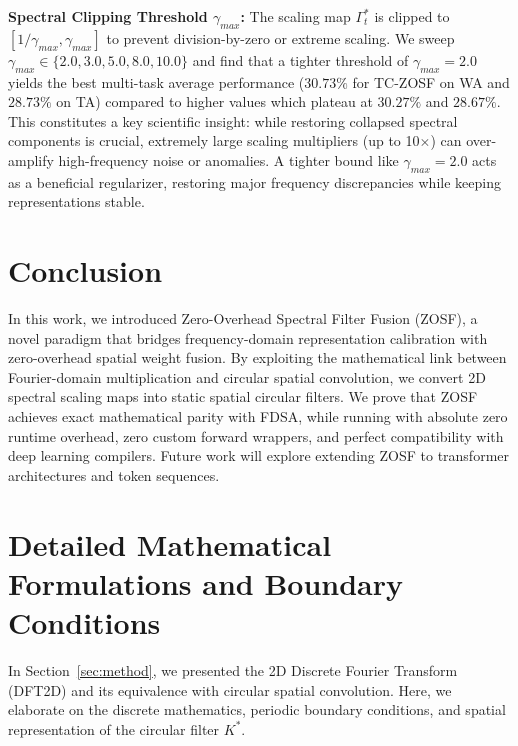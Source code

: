 \documentclass{article}
\theoremstyle{plain}
\theoremstyle{definition}
\theoremstyle{remark}
\begin{document}
\textbf{Spectral Clipping Threshold $\gamma_{max}$:} The scaling map $\Gamma^*_t$ is clipped to $[1/\gamma_{max}, \gamma_{max}]$ to prevent division-by-zero or extreme scaling. We sweep $\gamma_{max} \in \{2.0, 3.0, 5.0, 8.0, 10.0\}$ and find that a tighter threshold of $\gamma_{max} = 2.0$ yields the best multi-task average performance ($30.73\%$ for TC-ZOSF on WA and $28.73\%$ on TA) compared to higher values which plateau at $30.27\%$ and $28.67\%$. This constitutes a key scientific insight: while restoring collapsed spectral components is crucial, extremely large scaling multipliers (up to 10$\times$) can over-amplify high-frequency noise or anomalies. A tighter bound like $\gamma_{max} = 2.0$ acts as a beneficial regularizer, restoring major frequency discrepancies while keeping representations stable.

\section{Conclusion}
\label{sec:conclusion}

In this work, we introduced Zero-Overhead Spectral Filter Fusion (ZOSF), a novel paradigm that bridges frequency-domain representation calibration with zero-overhead spatial weight fusion. By exploiting the mathematical link between Fourier-domain multiplication and circular spatial convolution, we convert 2D spectral scaling maps into static spatial circular filters. We prove that ZOSF achieves exact mathematical parity with FDSA, while running with absolute zero runtime overhead, zero custom forward wrappers, and perfect compatibility with deep learning compilers. Future work will explore extending ZOSF to transformer architectures and token sequences.




\newpage
\appendix
\onecolumn

\section{Detailed Mathematical Formulations and Boundary Conditions}
\label{app:math}
In Section~\ref{sec:method}, we presented the 2D Discrete Fourier Transform (DFT2D) and its equivalence with circular spatial convolution. Here, we elaborate on the discrete mathematics, periodic boundary conditions, and spatial representation of the circular filter $K^*$.
\end{document}
